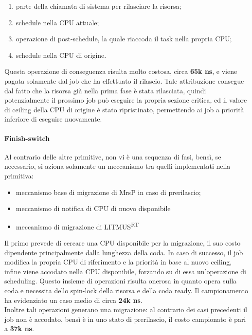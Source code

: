 \begin{enumerate}
	\item parte della chiamata di sistema per rilasciare la risorsa;
	\item schedule nella CPU attuale;
	\item operazione di post-schedule, la quale riaccoda il task nella propria CPU;
	\item schedule nella CPU di origine.
\end{enumerate}

\noindent Questa operazione di conseguenza risulta molto costosa, circa \textbf{65k ns}, e viene pagata solamente dal job che ha effettuato il rilascio. Tale attribuzione consegue dal fatto che la risorsa già nella prima fase è stata rilasciata, quindi potenzialmente il prossimo job può eseguire la propria sezione critica, ed il valore di ceiling della CPU di origine è stato ripristinato, permettendo ai job a priorità inferiore di eseguire nuovamente.\\

\paragraph{Finish-switch} Al contrario delle altre primitive, non vi è una sequenza di fasi, bensì, se necessario, si aziona solamente un meccanismo tra quelli implementati nella primitiva:

\begin{itemize}
	\item meccanismo base di migrazione di MrsP in caso di prerilascio;
	\item meccanismo di notifica di CPU di nuovo disponibile
  \item meccanismo di migrazione di LITMUS\textsuperscript{RT} 
\end{itemize}

\noindent Il primo prevede di cercare una CPU disponibile per la migrazione, il suo costo dipendente principalmente dalla lunghezza della coda. In caso di successo, il job modifica la propria CPU di riferimento e la priorità in base al nuovo ceiling, infine viene accodato nella CPU disponibile, forzando su di essa un'operazione di scheduling. Questo insieme di operazioni risulta onerosa in quanto opera sulla coda e necessita dello spin-lock della risorsa e della coda ready. Il campionamento ha evidenziato un caso medio di circa \textbf{24k ns}.\\

\noindent Inoltre tali operazioni generano una migrazione: al contrario dei casi precedenti il job non è accodato, bensì è in uno stato di prerilascio, il costo campionato è pari a \textbf{37k ns}.\\

